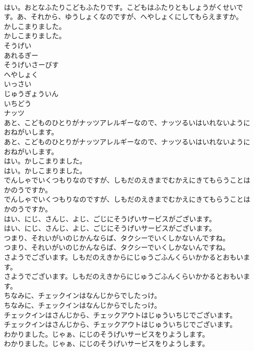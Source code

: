 \documentclass[8pt]{extreport}
\begin{document}
\begin{CJK}{UTF8}{min}
\\	はい。おとなふたりこどもふたりです。こどもはふたりともしょうがくせいです。あ、それから、ゆうしょくなのですが、へやしょくにしてもらえますか。
\\	かしこまりました。
\\	かしこまりました。
\\	そうげい
\\	あれるぎー
\\	そうげいさーびす
\\	へやしょく
\\	いっさい
\\	じゅうぎょういん
\\	いちどう
\\	ナッツ
\\	あと、こどものひとりがナッツアレルギーなので、ナッツるいはいれないようにおねがいします。
\\	あと、こどものひとりがナッツアレルギーなので、ナッツるいはいれないようにおねがいします。
\\	はい。かしこまりました。
\\	はい。かしこまりました。
\\	でんしゃでいくつもりなのですが、しもだのえきまでむかえにきてもらうことはかのうですか。
\\	でんしゃでいくつもりなのですが、しもだのえきまでむかえにきてもらうことはかのうですか。
\\	はい、にじ、さんじ、よじ、ごじにそうげいサービスがございます。
\\	はい、にじ、さんじ、よじ、ごじにそうげいサービスがございます。
\\	つまり、それいがいのじかんならば、タクシーでいくしかないんですね。
\\	つまり、それいがいのじかんならば、タクシーでいくしかないんですね。
\\	さようでございます。しもだのえきからにじゅうごふんくらいかかるとおもいます。
\\	さようでございます。しもだのえきからにじゅうごふんくらいかかるとおもいます。
\\	ちなみに、チェックインはなんじからでしたっけ。
\\	ちなみに、チェックインはなんじからでしたっけ。
\\	チェックインはさんじから、チェックアウトはじゅういちじでございます。
\\	チェックインはさんじから、チェックアウトはじゅういちじでございます。
\\	わかりました。じゃぁ、にじのそうげいサービスをりようします。
\\	わかりました。じゃぁ、にじのそうげいサービスをりようします。

\end{CJK}
\end{document}
